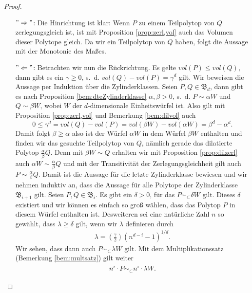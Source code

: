 \documentclass[11pt,titlepage]{article}
\theoremstyle{definition}
\theoremstyle{remark}
\begin{document}
	\begin{proof}
		\noindent
		\begin{itemize}
			\item[$"\Rightarrow"$:] Die Hinrichtung ist klar: Wenn $P$ zu einem Teilpolytop 
			von $Q$ zerlegungsgleich ist, ist mit 
			Proposition \ref{prop:zerl,vol} auch das Volumen
			dieser Polytope gleich. Da wir ein Teilpolytop von $Q$ 
			haben, folgt die Aussage mit der Monotonie des Maßes.
			\item[$"\Leftarrow"$:] Betrachten wir nun die Rückrichtung. 
			Es gelte $vol(P)\leq vol(Q)$, dann gibt es ein $\gamma\geq0$, s.~d. 
			$vol(Q)-vol(P)=\gamma^d$ gilt. Wir beweisen die Aussage 
			per Induktion über die Zylinderklassen. Seien  
			$P,Q\in\mathfrak{B}_d$, dann gibt es nach Proposition 
			\ref{bem:dteZylinderklasse} $\alpha,\beta>0$, s.~d. 
			$P\sim \alpha W$ und $Q\sim \beta W$, wobei $W$ 
			der $d$-dimensionale Einheitswürfel ist. Also gilt 
			mit Proposition \ref{prop:zerl,vol} und Bemerkung 
			\ref{bem:dilvol} auch
			\[0\leq \gamma^d =vol(Q)-vol(P)=vol(\beta W)-vol(\alpha W)
			=\beta^d -\alpha^d.\]
			Damit folgt $\beta\geq\alpha$ also ist der Würfel $\alpha W$ 
			in dem Würfel $\beta W$ enthalten und finden wir 
			das gesuchte Teilpolytop von $Q$, nämlich gerade 
			das dilatierte Polytop $\frac{\alpha}{\beta}Q$. Denn 
			mit $\beta W\sim Q$ erhalten wir mit 
			Proposition \ref{prop:dilzerl} auch 
			$\alpha W\sim \frac{\alpha}{\beta}Q$ und mit der 
			Transitivität der Zerlegungsgleichheit 
			gilt auch $P\sim \frac{\alpha}{\beta}Q$. Damit ist 
			die Aussage für die letzte Zylinderklasse bewiesen und 
			wir nehmen induktiv an, dass die Aussage für alle Polytope 
			der Zylinderklasse $\mathfrak{B}_{i+1}$ gilt. Seien  
			$P,Q\in\mathfrak{B}_i$. Es gibt ein $\delta>0$, für das 
			$P\sim_{\subset}\delta W$ gilt. Dieses $\delta$ existiert und 
			wir können es einfach so groß wählen, dass das Polytop $P$ 
			in diesem Würfel enthalten ist. Desweiteren sei eine 
			natürliche Zahl $n$ so gewählt, dass $\lambda\geq\delta$ gilt, wenn 
			wir $\lambda$ definieren durch 
			\begin{align}
				\lambda=\left(\frac{\gamma}{2}\right)(n^{d-i}-1)^{1/d}. \label{lemma:teilzerl;6}
			\end{align}
			Wir sehen, dass dann auch 
			$P\sim_{\subset}\lambda W$ gilt. Mit dem 
			Multiplikationssatz (Bemerkung \ref{bem:multsatz}) gilt weiter
			\begin{align}
				n^i\cdot P\sim_{\subset}n^i \cdot \lambda W.\label{lemma:teilzerl;1}
			\end{align}

\end{itemize}
\end{proof}
\end{document}
